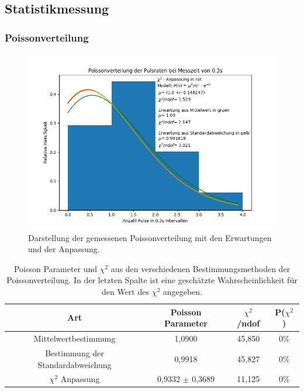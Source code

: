 \documentclass[12pt,a4paper]{article}
\begin{document}
\newpage


\subsection{Statistikmessung}

\subsubsection{Poissonverteilung}
\begin{figure}
\centering
\includegraphics[scale=0.8]{Bilder/poisson.PNG}
\caption{Darstellung der gemessenen Poissonverteilung mit den Erwartungen und der Anpassung.}
\label{fig:Poisson}
\end{figure}

\begin{table}
\centering
\begin{tabular}{|c|c|c|c|}
\hline 
Art & Poisson Parameter & $\chi ^2$ /ndof & P($\chi ^2$) \\ 
\hline 
Mittelwertbestimmung & 1,0900 & 45,850 & 0\% \\ 
\hline 
Bestimmung der Standardabweichung & 0,9918 & 45,827 & 0\% \\ 
\hline 
$\chi ^2$ Anpassung & 0,9332 $\pm$ 0,3689 & 11,125 & 0\% \\ 
\hline 
\end{tabular} 
\caption{Poisson Parameter und $\chi ^2$ aus den verschiedenen Bestimmungsmethoden der Poissonverteilung. In der letzten Spalte ist eine geschätzte Wahrscheinlichkeit für den Wert des $\chi ^2$ angegeben.}
\label{tab:Poisson}
\end{table}
\end{document}
